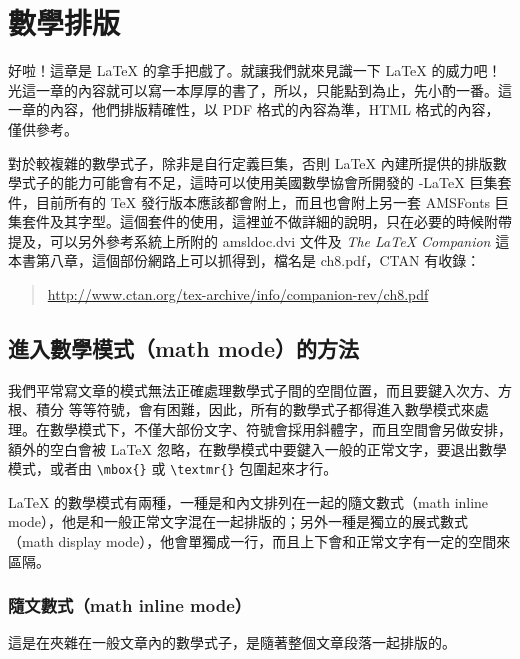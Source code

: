 
\chapter{數學排版}
\label{ch:math}

好啦！這章是 \LaTeX{} 的拿手把戲了。就讓我們就來見識一下 \LaTeX{} 的威力吧！光這一章的內容就可以寫一本厚厚的書了，所以，只能點到為止，先小酌一番。這一章的內容，他們排版精確性，以 PDF 格式的內容為準，HTML 格式的內容，僅供參考。

對於較複雜的數學式子，除非是自行定義巨集，否則 \LaTeX{} 內建所提供的排版數學式子的能力可能會有不足，這時可以使用美國數學協會所開發的 \AmS{}-\LaTeX{} 巨集套件，目前所有的 \TeX{} 發行版本應該都會附上，而且也會附上另一套 {\sffamily AMSFonts} 巨集套件及其字型。這個套件的使用，這裡並不做詳細的說明，只在必要的時候附帶提及，可以另外參考系統上所附的 {\ttfamily amsldoc.dvi} 文件及 \textit{The \LaTeX{} Companion} 這本書第八章，這個部份網路上可以抓得到，檔名是 {\ttfamily ch8.pdf}，CTAN 有收錄：

\begin{quote}
  \url{http://www.ctan.org/tex-archive/info/companion-rev/ch8.pdf}
\end{quote}

\section{進入數學模式（math mode）的方法}

我們平常寫文章的模式無法正確處理數學式子間的空間位置，而且要鍵入次方、方根、積分 \chdots{} 等等符號，會有困難，因此，所有的數學式子都得進入數學模式來處理。在數學模式下，不僅大部份文字、符號會採用斜體字，而且空間會另做安排，額外的空白會被 \LaTeX{} 忽略，在數學模式中要鍵入一般的正常文字，要退出數學模式，或者由 \verb|\mbox{}| 或 \verb|\textmr{}| 包圍起來才行。

\LaTeX{} 的數學模式有兩種，一種是和內文排列在一起的隨文數式（math inline mode），他是和一般正常文字混在一起排版的；另外一種是獨立的展式數式（math display mode），他會單獨成一行，而且上下會和正常文字有一定的空間來區隔。

\subsection{隨文數式（math inline mode）}
這是在夾雜在一般文章內的數學式子，是隨著整個文章段落一起排版的。

